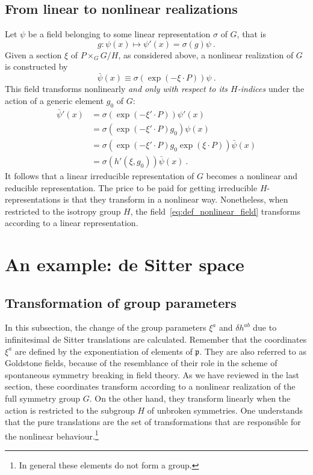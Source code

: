 \documentclass[11pt]{article}
\begin{document}
\subsection{From linear to nonlinear realizations}

Let $\psi$ be a field belonging to some linear representation 
$\sigma$ of $G$, that is
%
\begin{equation}
	g : \psi(x) \mapsto \psi'(x) = \sigma(g) \psi~.
\end{equation}
Given a section $\xi$ of $P \times_G G/H$, as considered above, a 
nonlinear realization of $G$ is constructed by
%
\begin{equation}\label{eq:def_nonlinear_field}
	\bar{\psi}(x) \equiv \sigma(\exp(-\xi\cdot P))\psi~.
\end{equation}
This field transforms nonlinearly \emph{and only with respect to 
	its $H$-indices} under the action of a generic element $g_0$ 
of $G$:
%
\begin{displaymath}
\begin{split}
	\bar{\psi}'(x) &= \sigma(\exp(-\xi'\cdot P)) \psi'(x) \\
	&= \sigma(\exp(-\xi'\cdot P)g_0) \psi(x) \\
	&= \sigma(\exp(-\xi'\cdot P)g_0\exp(\xi\cdot P)) \bar{\psi}(x) 
	\\
	&= \sigma(h'(\xi,g_0)) \bar{\psi}(x)~.
\end{split}
\end{displaymath}
It follows that a linear irreducible representation of $G$ 
becomes a nonlinear and reducible representation. The price to be 
paid for getting irreducible $H$-representations is that they 
transform in a nonlinear way. Nonetheless, when restricted to the 
isotropy group $H$, the field~\eqref{eq:def_nonlinear_field} 
transforms according to a linear representation.

\section{An example: de Sitter space}

\subsection{Transformation of group parameters}

In this subsection, the change of the group parameters $\xi^a$ 
and $\delta h^{ab}$ due to infinitesimal de Sitter translations 
are calculated. Remember that the coordinates $\xi^a$ are defined 
by the exponentiation of elements of $\mathfrak{p}$. They are 
also referred to as Goldstone fields, because of the resemblance 
of their role in the scheme of spontaneous symmetry breaking in 
field theory. As we have reviewed in the last section, these 
coordinates transform according to a nonlinear realization of the 
full symmetry group $G$. On the other hand, they transform 
linearly when the action is restricted to the subgroup $H$ of 
unbroken symmetries.  One understands that the pure translations 
are the set of transformations that are responsible for the 
nonlinear behaviour.\footnote{In general these elements do not 
	form a group.}
\end{document}
